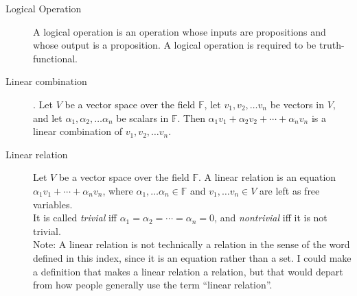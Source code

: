 \documentclass[12pt]{article}
\begin{document}
\begin{description}
  \item[Logical Operation] A logical operation is an operation whose
    inputs are propositions and whose output is a proposition.  A
    logical operation is required to be truth-functional.

  \item[Linear combination].  Let $V$ be a vector space over the field
    $\mathbb{F}$, let $v_1,v_2,\ldots v_n$ be vectors in $V$, and let
    $\alpha_1,\alpha_2,\ldots\alpha_n$ be scalars in $\mathbb{F}$.
    Then $\alpha_1v_1+\alpha_2v_2+\cdots+\alpha_nv_n$ is a linear
    combination of $v_1,v_2,\ldots v_n$.
    
  \item[Linear relation] Let $V$ be a vector space over the field
    $\mathbb{F}$.  A linear relation is an equation
    $\alpha_1v_1+\cdots+\alpha_nv_n$, where
    $\alpha_1,\ldots\alpha_n\in\mathbb{F}$ and $v_1,\ldots v_n\in V$
    are left as free variables. \\



    It is called \textit{trivial} iff
    $\alpha_1=\alpha_2=\cdots=\alpha_n=0$, and \textit{nontrivial} iff
    it is not trivial. \\

    Note: A linear relation is not technically a relation in the sense
    of the word defined in this index, since it is an equation rather
    than a set.  I could make a definition that makes a linear
    relation a relation, but that would depart from how people
    generally use the term ``linear relation''.
    

\end{description}
\end{document}
